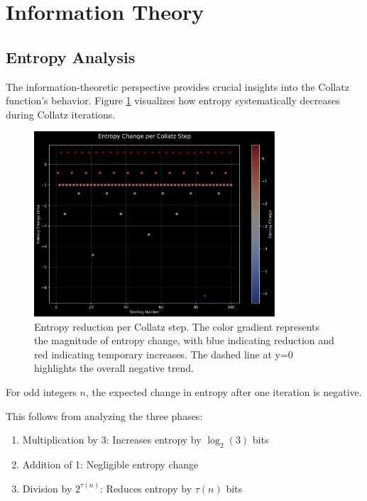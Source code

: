 \section{Information Theory}\label{sec:information_theory}

\subsection{Entropy Analysis}

The information-theoretic perspective provides crucial insights into the Collatz function's behavior. Figure \ref{fig:entropy_reduction} visualizes how entropy systematically decreases during Collatz iterations.

\begin{figure}[h]
\centering
\includegraphics[width=0.8\textwidth]{figures/entropy_reduction.svg}
\caption{Entropy reduction per Collatz step. The color gradient represents the magnitude of entropy change, with blue indicating reduction and red indicating temporary increases. The dashed line at y=0 highlights the overall negative trend.}
\label{fig:entropy_reduction}
\end{figure}

\begin{theorem}\label{thm:entropy}
For odd integers $n$, the expected change in entropy after one iteration is negative.
\end{theorem}

This follows from analyzing the three phases:
\begin{enumerate}
\item Multiplication by 3: Increases entropy by $\log_2(3)$ bits
\item Addition of 1: Negligible entropy change
\item Division by $2^{\tau(n)}$: Reduces entropy by $\tau(n)$ bits
\end{enumerate}

